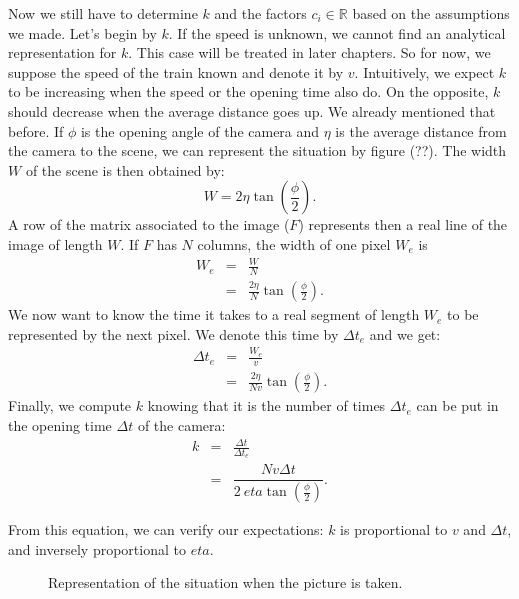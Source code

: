 Now we still have to determine $k$ and the factors $c_i \in \mathbb{R}$ based on the assumptions we made. Let's begin by $k$. If the speed is unknown, we cannot find an analytical representation for $k$. This case will be treated in later chapters. So for now, we suppose the speed of the train known and denote it by $v$. Intuitively, we expect $k$ to be increasing when the speed or the opening time also do. On the opposite, $k$ should decrease when the average distance goes up. We already mentioned that before. If $\phi$ is the opening angle of the camera and $\eta$ is the average distance from the camera to the scene, we can represent the situation by figure (??). The width $W$ of the scene is then obtained by: 
\begin{equation}
W = 2 \eta \tan\left(\frac{\phi}{2}\right).
\end{equation}
A row of the matrix associated to the image ($F$) represents then a real line of the image of length $W$. If $F$ has $N$ columns, the width of one pixel $W_e$ is
\begin{eqnarray}
W_e &=& \frac{W}{N} \\
&=& \frac{2 \eta }{N}\tan\left(\frac{\phi}{2}\right).
\end{eqnarray}
We now want to know the time it takes to a real segment of length $W_e$ to be represented by the next pixel. We denote this time by $\Delta t_e$ and we get:
\begin{eqnarray}
\Delta t_e &=&\frac{W_e}{v}\\
&=& \frac{2 \eta }{Nv}\tan\left(\frac{\phi}{2}\right).
\end{eqnarray}
Finally, we compute $k$ knowing that it is the number of times $\Delta t_e$ can be put in the opening time $\Delta t$ of the camera:
\begin{eqnarray}
k &=& \frac{\Delta t}{\Delta t _e} \\
&=& \dfrac{Nv\Delta t}{2 \ eta \tan\left(\frac{\phi}{2}\right)}.
\end{eqnarray}

From this equation, we can verify our expectations: $k$ is proportional to $v$ and $\Delta t$, and inversely proportional to $eta$.

\begin{figure}
\begin{center}
\end{center}
\caption{Representation of the situation when the picture is taken.}
\label{situation}
\end{figure}

